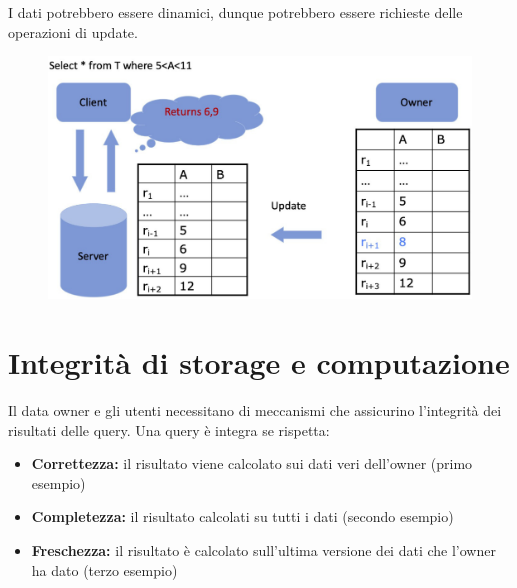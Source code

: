 \documentclass{report}
\begin{document}
I dati potrebbero essere dinamici, dunque potrebbero 
essere richieste delle operazioni di update.

\begin{figure}[H]
    \centering
    \includegraphics[width=0.9\linewidth]{images/ex4.png}
\end{figure}

\section{Integrità di storage e computazione}

Il data owner e gli utenti necessitano di meccanismi che assicurino l'integrità dei risultati 
delle query. Una query è integra se rispetta:
\begin{itemize}
    \item \textbf{Correttezza:} il risultato viene calcolato sui dati veri dell'owner (primo esempio)
    \item \textbf{Completezza:} il risultato calcolati su tutti i dati (secondo esempio)
    \item \textbf{Freschezza:} il risultato è calcolato sull'ultima versione dei dati che l'owner 
    ha dato (terzo esempio)
\end{itemize}
\end{document}
